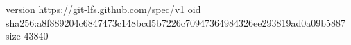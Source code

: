 version https://git-lfs.github.com/spec/v1
oid sha256:a8f889204c6847473c148bcd5b7226c70947364984326ee293819ad0a09b5887
size 43840
